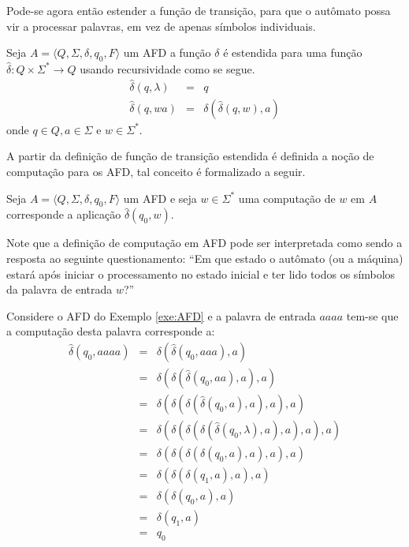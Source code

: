 Pode-se agora então estender a função de transição, para que o autômato possa vir a processar palavras, em vez de apenas símbolos individuais. 

\begin{definition}\label{def:DeltaEstendido}
	Seja $A = \langle Q, \Sigma, \delta, q_0, F\rangle$ um AFD a função $\delta$ é estendida para uma função $\widehat{\delta}: Q \times \Sigma^* \rightarrow Q$ usando recursividade como se segue.
	\begin{eqnarray}\label{eq:ExtensaoDaFuncaoTransicaoDelta}
		\widehat{\delta}(q, \lambda)& = & q \\
		\widehat{\delta}(q, wa)& = & \delta(\widehat{\delta}(q, w), a)	
	\end{eqnarray}
	onde $q \in Q, a \in \Sigma$ e $w \in \Sigma^*$.
\end{definition}

A partir da definição de função de transição estendida é definida  a noção de computação para os AFD, tal conceito é formalizado a seguir.

\begin{definition}\label{def:ComputacaoAFD}
	Seja $A = \langle Q, \Sigma, \delta, q_0, F\rangle$ um AFD e seja $w \in \Sigma^*$ uma computação de $w$ em $A$ corresponde a aplicação $\widehat{\delta}(q_0, w)$.
\end{definition}

Note que a definição de computação em AFD pode ser interpretada como sendo a resposta ao seguinte questionamento: ``Em que estado o autômato (ou a máquina) estará após iniciar o processamento no estado inicial e ter lido todos os símbolos da palavra de entrada $w$?''

\begin{example}\label{exe:ComputacaoAFD1}
	Considere o AFD do Exemplo \ref{exe:AFD} e a palavra de entrada $aaaa$ tem-se que a computação desta palavra corresponde a:
	\begin{eqnarray*}
		\widehat{\delta}(q_0, aaaa) & = & \delta(\widehat{\delta}(q_0, aaa), a)\\
		& = & \delta(\delta(\widehat{\delta}(q_0, aa), a), a)\\
		& = & \delta(\delta(\delta(\widehat{\delta}(q_0, a), a), a), a)\\
		& = & \delta(\delta(\delta(\delta(\widehat{\delta}(q_0, \lambda), a), a), a), a)\\
		& = & \delta(\delta(\delta(\delta(q_0, a), a), a), a)\\
		& = & \delta(\delta(\delta(q_1, a), a), a)\\
		& = & \delta(\delta(q_0, a), a)\\
		& = & \delta(q_1, a)\\
		& = & q_0
	\end{eqnarray*}
\end{example}

